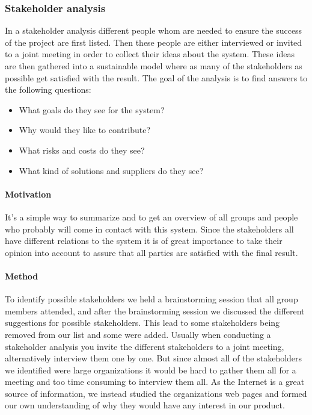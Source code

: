 \documentclass[10pt]{article}
\begin{document}
\subsubsection{Stakeholder analysis}
In a stakeholder analysis different people whom are needed to ensure the success of the project are first listed. Then these people are either interviewed or invited to a joint meeting in order to collect their ideas about the system. These ideas are then gathered into a sustainable model where as many of the stakeholders as possible get satisfied with the result. The goal of the analysis is to find answers to the following questions:
\begin{itemize}
\item What goals do they see for the system?
\item Why would they like to contribute?
\item What risks and costs do they see?
\item What kind of solutions and suppliers do they see?
\end{itemize}

\paragraph{Motivation}
\hfill \break
It’s a simple way to summarize and to get an overview of all groups and people who probably will come in contact with this system. Since the stakeholders all have different relations to the system it is of great importance to take their opinion into account to assure that all parties are satisfied with the final result.
\paragraph{Method}
\hfill \break
To identify possible stakeholders we held a brainstorming session that all group members attended, and after the brainstorming session we discussed the different suggestions for possible stakeholders. This lead to some stakeholders being removed from our list and some were added.  
Usually when conducting a stakeholder analysis you invite the different stakeholders to a joint meeting, alternatively interview them one by one. But since almost all of the stakeholders we identified were large organizations it would be hard to gather them all for a meeting and too time consuming to interview them all. As the Internet is a great source of information, we instead studied the organizations web pages and formed our own understanding of why they would have any interest in our product. 
\end{document}
